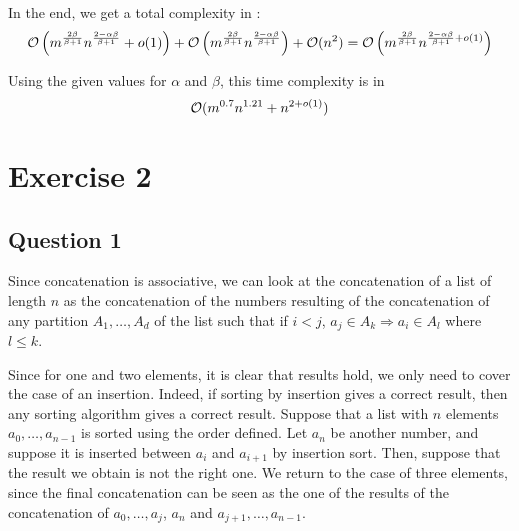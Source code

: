 \documentclass{Cours}
\begin{document}
        In the end, we get a total complexity in : 
        \[
            \mathcal{O}\left(m^{\frac{2\beta}{\beta + 1}}n^{\frac{2 - \alpha \beta}{\beta + 1}} + o(1)\right) + \mathcal{O}\left(m^{\frac{2\beta}{\beta + 1}}n^{\frac{2 - \alpha \beta}{\beta + 1}}\right) + \mathcal{O}(n^{2}) = \mathcal{O}\left(m^{\frac{2\beta}{\beta + 1}}n^{\frac{2 - \alpha \beta}{\beta + 1} + o(1)}\right)
        \]

        Using the given values for $\alpha$ and $\beta$, this time complexity is in \[\mathcal{O}(m^{0.7}n^{1.21} + n^{2 + o(1)})\]   

    \section{Exercise 2}
        \subsection{Question 1}
            Since concatenation is associative, we can look at the concatenation of a list of length $n$ as the concatenation of the numbers resulting of the concatenation of any partition $A_{1}, \ldots, A_{d}$ of the list such that if $i < j$, $a_{j} \in A_{k} \Rightarrow a_{i} \in A_{l}$ where $l \leq k$.
            
            Since for one and two elements, it is clear that results hold, we only need to cover the case of an insertion. Indeed, if sorting by insertion gives a correct result, then any sorting algorithm gives a correct result. Suppose that a list with $n$ elements $a_{0}, \ldots, a_{n- 1}$ is sorted using the order defined. Let $a_{n}$ be another number, and suppose it is inserted between $a_{i}$ and $a_{i + 1}$ by insertion sort.
            Then, suppose that the result we obtain is not the right one. We return to the case of three elements, since the final concatenation can be seen as the one of the results of the concatenation of $a_{0}, \ldots, a_{j}$, $a_{n}$ and $a_{j + 1}, \ldots, a_{n - 1}$.  
\end{document}

